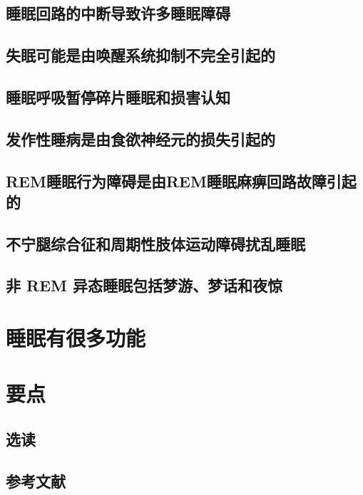 \subsection{睡眠回路的中断导致许多睡眠障碍}
\subsection{失眠可能是由唤醒系统抑制不完全引起的}
\subsection{睡眠呼吸暂停碎片睡眠和损害认知}
\subsection{发作性睡病是由食欲神经元的损失引起的}
\subsection{REM睡眠行为障碍是由REM睡眠麻痹回路故障引起的}
\subsection{不宁腿综合征和周期性肢体运动障碍扰乱睡眠}
\subsection{非 REM 异态睡眠包括梦游、梦话和夜惊}

\section{睡眠有很多功能}

\section{要点}
\subsection{选读}
\subsection{参考文献}
